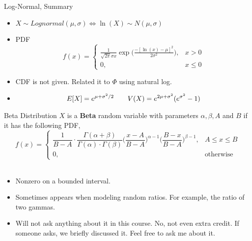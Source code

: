 \documentclass[handout]{beamer}
\newcommand{\nl}[1]{\vspace{#1 em}}
\begin{document}
\begin{frame}{Log-Normal, Summary}
    \begin{itemize}
        \item $X\sim Lognormal(\mu,\sigma) \iff \ln(X) \sim N(\mu, \sigma)$
        \item PDF
              $$f(x) =\begin{cases} \frac{1}{\sqrt{2\pi}\sigma x} \exp\bigg( \frac{-[\ln(x) - \mu]^2}{2 \sigma^2}\bigg), & x> 0 \\ 0, & x\leq 0\end{cases} $$
        \item CDF is not given. Related it to $\Phi$ using natural log.
        \item $$ E[X] = e^{\mu + \sigma^2/2} \hskip 2em V(X) = e^{2\mu + \sigma^2}(e^{\sigma^2} - 1) $$
    \end{itemize}
\end{frame}
\begin{frame}{Beta Distribution}     
    $X$ is a \textbf{Beta} random variable with parameters $\alpha,\beta,A$ and $B$ if it has the following PDF,
    $$f(x) =\begin{cases} \dfrac{1}{B-A}\cdot \dfrac{\Gamma(\alpha + \beta)}{\Gamma(\alpha) \cdot \Gamma(\beta)} \bigg( \dfrac{x-A}{B-A} \bigg)^{\alpha-1} \bigg( \dfrac{B-x}{B-A} \bigg)^{\beta-1} , & A\leq x \leq B \\ 0, & \text{otherwise}\end{cases} $$
        \\ \nl{0.5}
        \begin{itemize}
            \item Nonzero on a bounded interval.
            \item Sometimes appears when modeling random ratios. For example, the ratio of two gammas.
            \item Will not ask anything about it in this course. No, not even extra credit. If someone asks, we briefly discussed it. Feel free to ask me about it.
        \end{itemize}
        \vfill
\end{frame}
\end{document}
